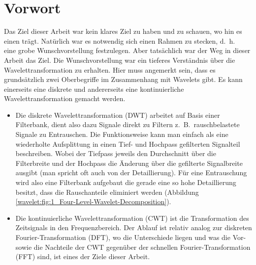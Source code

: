 %
%
%
%
\section{Vorwort\label{wavelets:section:teil0}}
Das Ziel dieser Arbeit war kein klares Ziel zu haben und zu schauen,
wo hin es einen trägt.
Natürlich war es notwendig sich einen Rahmen zu stecken, d.~h.~
eine grobe Wunschvorstellung festzulegen.
Aber tatsächlich war der Weg in dieser Arbeit das Ziel.
Die Wunschvorstellung war ein tieferes Verständnis über die
Wavelettransformation zu erhalten.
Hier muss angemerkt sein, dass es grundsätzlich zwei Oberbegriffe
im Zusammenhang mit Wavelets gibt.
Es kann einerseits eine diskrete und andererseits eine kontinuierliche
Wavelettransformation gemacht werden.

\begin{itemize}
\item   Die diskrete Wavelettransformation (DWT) arbeitet auf Basis
einer Filterbank, dient also dazu Signale direkt zu Filtern
z.~B.~rauschbelastete Signale zu Entrauschen.
%
%
Die Funktionsweise kann man einfach als eine wiederholte
Aufsplittung in einen Tief- und Hochpass gefilterten
Signalteil beschreiben.
Wobei der Tiefpass jeweils den Durchschnitt über die Filterbreite
und der Hochpass die Änderung über die gefilterte Signalbreite
ausgibt (man spricht oft auch von der Detaillierung).
Für eine Entrauschung wird also eine Filterbank aufgebaut die gerade
%
eine so hohe Detaillierung besitzt, dass die Rauschanteile eliminiert
werden (Abbildung \ref{wavelet:fig:1_Four-Level-Wavelet-Decomposition}).

\item Die kontinuierliche Wavelettransformation (CWT) ist
%
die Transformation des Zeitsignals in den Frequenzbereich.
Der Ablauf ist relativ analog zur diskreten Fourier-Transformation
(DFT), wo die Unterschiede liegen und was die Vor- sowie die Nachteile
der CWT gegenüber der schnellen Fourier-Transformation (FFT) sind,
ist eines der Ziele dieser Arbeit.
\end{itemize}


